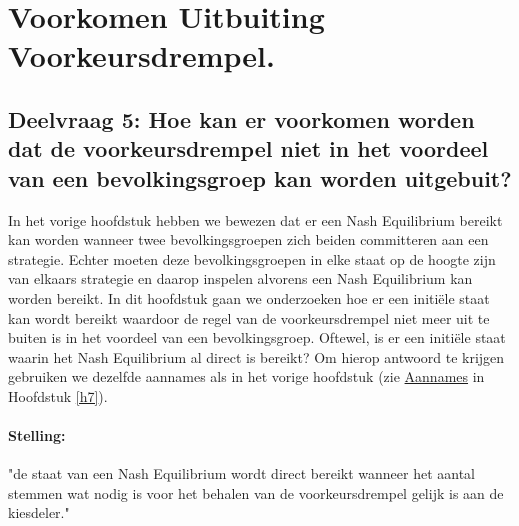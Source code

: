 \newpage
\section{Voorkomen Uitbuiting Voorkeursdrempel.}
\label{h8}

\subsection*{Deelvraag 5: Hoe kan er voorkomen worden dat de voorkeursdrempel niet in het voordeel van een bevolkingsgroep kan worden uitgebuit?}

In het vorige hoofdstuk hebben we bewezen dat er een Nash Equilibrium bereikt kan worden wanneer twee bevolkingsgroepen zich beiden committeren aan een strategie. Echter moeten deze bevolkingsgroepen in elke staat op de hoogte zijn van elkaars strategie en daarop inspelen alvorens een Nash Equilibrium kan worden bereikt. In dit hoofdstuk gaan we onderzoeken hoe er een initi\"{e}le staat kan wordt bereikt waardoor de regel van de voorkeursdrempel niet meer uit te buiten is in het voordeel van een bevolkingsgroep. Oftewel, is er een initi\"{e}le staat waarin het Nash Equilibrium al direct is bereikt? Om hierop antwoord te krijgen gebruiken we dezelfde aannames als in het vorige hoofdstuk (zie \hyperref[aannamesNash]{Aannames} in Hoofdstuk \ref{h7}). 


\paragraph{Stelling:} "de staat van een Nash Equilibrium wordt direct bereikt wanneer het aantal stemmen wat nodig is voor het behalen van de voorkeursdrempel gelijk is aan de kiesdeler." \\

